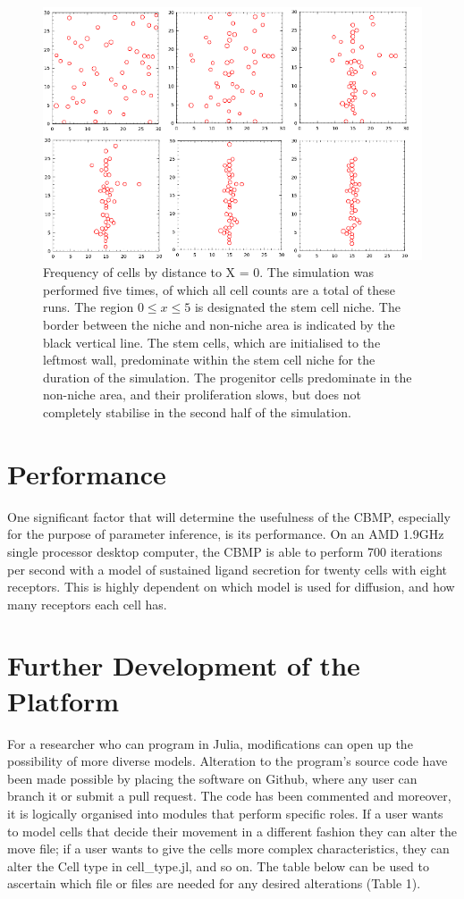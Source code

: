 \documentclass[12pt]{article}
\begin{document}
\begin{figure}[H]
\centering
\includegraphics[width=\linewidth]{media/Collated_determinstic.png}

\caption{Frequency of cells by distance 
to X = 0. The simulation was performed five times, of which all cell 
counts are a total of these runs. The region \(0 \leq x \leq 5\) is 
designated the stem cell niche. The border between the niche and 
non-niche area is indicated by the black vertical line. The stem cells, 
which are initialised to the leftmost wall, predominate within the stem 
cell niche for the duration of the simulation. The progenitor cells 
predominate in the non-niche area, and their proliferation slows, but 
does not completely stabilise in the second half of the simulation.}
\end{figure}

\section{Performance}

One significant factor that will determine the usefulness of the CBMP, 
especially for the purpose of parameter inference, is its performance. 
On an AMD 1.9GHz single processor desktop computer, the CBMP is able to 
perform 700 iterations per second with a model of sustained ligand 
secretion for twenty cells with eight receptors. This is highly 
dependent on which model is used for diffusion, and how many receptors 
each cell has.

\section{Further Development of the Platform}
For a researcher who can program in Julia, modifications can open up the 
possibility of more diverse models. Alteration to the program's source 
code have been made possible by placing the software on Github, where 
any user can branch it or submit a pull request. The code has been 
commented and moreover, it is logically organised into modules that 
perform specific roles. If a user wants to model cells that decide their 
movement in a different fashion they can alter the move file; if a user 
wants to give the cells more complex characteristics, they can alter the 
Cell type in cell\_type.jl, and so on. The table below can be used to 
ascertain which file or files are needed for any desired alterations 
(Table 1).
\end{document}

